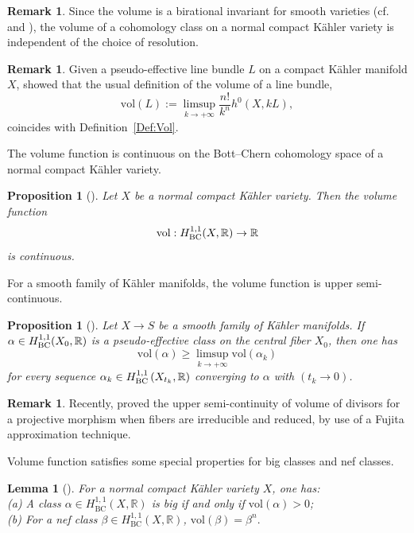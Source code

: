 \documentclass[12pt]{amsart}
\numberwithin{equation}{section}
\newtheorem{proposition}[theorem]{Proposition}
\newtheorem{lemma}  [theorem]     {Lemma}
\theoremstyle{definition}
\theoremstyle{plain}
\newtheorem*{thm A*}{Theorem A}
\newtheorem*{thm B*}{Theorem B}
\newtheorem*{thm C*}{Theorem C}
\newtheorem*{thm D*}{Theorem D}
\theoremstyle{definition}
\newtheorem{remark}  [theorem]     {Remark}
\renewcommand{\1}{\mathds{1}}
\newcommand{\vol}{\mathrm{vol}}
\renewcommand{\>}{\rightarrow}
\begin{document}
\begin{remark}
Since the volume is a birational invariant for smooth varieties (cf. \cite[Example 2.2.49]{Laza04} and \cite{Boucksom02}), the volume of a cohomology class on a normal compact K\"ahler variety is independent of the choice of resolution.
\end{remark}
\begin{remark}
Given a pseudo-effective line bundle $L$ on a compact K\"ahler manifold $X$, \cite[Theorem 1.2]{Boucksom02} showed that the usual definition of the volume of a line bundle,
$$
\vol(L) := \limsup_{k \to +\infty} \frac{n!}{k^n} h^0(X, kL),
$$
coincides with Definition~\ref{Def:Vol}.
\end{remark}
The volume function is continuous on the Bott–Chern cohomology space of a normal compact K\"ahler variety.
\begin{proposition}[{\cite[Corollary 4.11]{Boucksom02}}]\label{ContVol}
Let $X$ be a normal compact K\"ahler variety. Then the volume function $$\vol : H^{1,1}_{\rm{BC}}(X,\mathbb{R})\to \mathbb{R}$$is continuous. 
\end{proposition}

For a smooth family of K\"ahler manifolds, the volume function is upper semi-continuous.
\begin{proposition}[{\cite[Proposition 4.13]{Boucksom02}}]\label{uscvolume}
Let ${X} \rightarrow S$ be a smooth family of K\"ahler manifolds. If $\alpha \in H^{1,1}_{\rm{BC}}(X_0, \mathbb{R})$ is a pseudo-effective class on the central fiber $X_0$, then one has
$$
\mathrm{vol}(\alpha) \ge \limsup _{k \rightarrow+\infty} \mathrm{vol}\left(\alpha_k\right)
$$
for every sequence $\alpha_k \in H^{1,1}_{\rm{BC}}\left(X_{t_k}, \mathbb{R}\right)$ converging to $\alpha$ with $(t_k \rightarrow 0)$.
\end{proposition}
\begin{remark}
Recently, \cite{Jiao} proved the upper semi-continuity of volume of divisors for a projective morphism when fibers are irreducible and reduced, by use of a Fujita approximation technique. 
\end{remark}
Volume function satisfies some special properties for big classes and nef classes.

\begin{lemma}[{\cite[Theorems 4.1, 4.7]{Boucksom02}}]\label{BigVol}
For a normal compact K\"ahler variety $X$, one has: \\
(a) A class $\alpha \in H^{1,1}_{\mathrm{BC}}(X, \mathbb{R})$ is big if and only if $\mathrm{vol}(\alpha)>0$;\\
(b) For a nef class $\beta\in H^{1,1}_{\mathrm{BC}}(X,\mathbb{R})$, $\mathrm{vol}(\beta) =\beta^n.$
\end{lemma}
\end{document}
